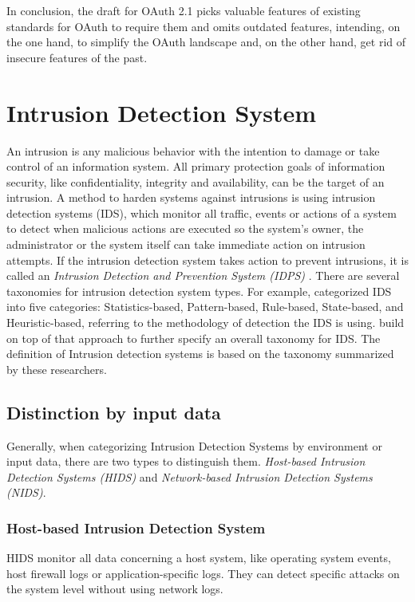 \documentclass[
    fontsize=12pt,
    headings=small,
    parskip=half,           %
    bibliography=totoc,
    numbers=noenddot,       %
    open=any,               %
    ]{scrreprt}
\begin{document}
In conclusion, the draft for OAuth 2.1 picks valuable features of existing standards for OAuth to require them and omits outdated features, intending, on the one hand, to simplify the OAuth landscape and, on the other hand, get rid of insecure features of the past.

\section{Intrusion Detection System}
An intrusion is any malicious behavior with the intention to damage or take control of an information system. All primary protection goals of information security, like confidentiality, integrity and availability, can be the target of an intrusion. A method to harden systems against intrusions is using intrusion detection systems (IDS), which monitor all traffic, events or actions of a system to detect when malicious actions are executed so the system's owner, the administrator or the system itself can take immediate action on intrusion attempts. If the intrusion detection system takes action to prevent intrusions, it is called an \emph{Intrusion Detection and Prevention System (IDPS)} \cite{scarfone2010intrusion}. There are several taxonomies for intrusion detection system types. For example, \cite{Liao2013IntrusionDS} categorized IDS into five categories: Statistics-based, Pattern-based, Rule-based, State-based, and Heuristic-based, referring to the methodology of detection the IDS is using. \cite{khraisat2019survey} build on top of that approach to further specify an overall taxonomy for IDS. The definition of Intrusion detection systems is based on the taxonomy summarized by these researchers.

\subsection{Distinction by input data}
Generally, when categorizing Intrusion Detection Systems by environment or input data, there are two types to distinguish them. 
\emph{Host-based Intrusion Detection Systems (HIDS)} and \emph{Network-based Intrusion Detection Systems (NIDS)}.
\subsubsection{Host-based Intrusion Detection System}
HIDS monitor all data concerning a host system, like operating system events, host firewall logs or application-specific logs. They can detect specific attacks on the system level without using network logs.
\end{document}
